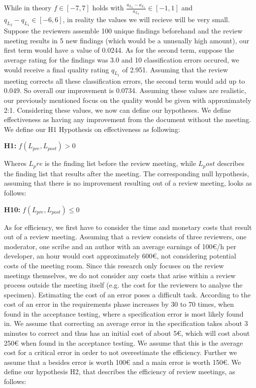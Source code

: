 While in theory $f \in [-7, 7]$ holds with $\frac{a_{L_2} - a_{L_1}}{a_{L_2}} \in [-1, 1]$ and $q_{L_2} - q_{L_1} \in [-6, 6]$, in reality the values we will recieve will be very small. Suppose the reviewers assemble 100 unique findings beforehand and the review meeting results in 5 new findings (which would be a unusually high amount), our first term
would have a value of 0.0244.
As for the second term, suppose the average rating for the findings was 3.0 and 10 classification errors occured, we would receive a final quality rating $q_{L_1}$ of 2.951. Assuming that the review meeting corrects all these classification errors, the second term would add up to 0.049. So overall our improvement is 0.0734. Assuming these values are realistic, our previously mentioned focus on the quality would be given with approximately 2:1.
Considering these values, we now can define our hypotheses.
We define effectiveness as having any improvement from the document without the meeting.
We define our H1 Hypothesis on effectiveness as following:

\begin{center}
\textbf{H1:} $f(L_{pre}, L_{post}) > 0$
\end{center}

Wheres $L_pre$ is the finding list before the review meeting, while $L_post$ describes the finding list that results after the meeting.
The corresponding null hypothesis, assuming that there is no improvement resulting out of a review meeting, looks as follows:

\begin{center}
\textbf{H10:} $f(L_{pre}, L_{post}) \le 0$
\end{center}

As for efficiency, we first have to consider the time and monetary costs that result out of a review meeting. Assuming that a review consists of three reviewers, one moderator, one scribe and an author with an average earnings of 100€/h per developer, an hour would cost approximately 600€, not considering potential costs of the meeting room. Since this research only focuses on the review meetings themselves, we do not consider any costs that arise within a review process outside the meeting itself (e.g. the cost for the reviewers to analyse the specimen). Estimating the cost of an error poses a difficult task. According to \cite{stecklein2004error} the cost of an error in the requirements phase increases by 30 to 70 times, when found in the acceptance testing, where a specification error is most likely found in. We assume that correcting an average error in the specification takes about 3 minutes to correct and thus has an initial cost of about 5€, which will cost about 250€ when found in the acceptance testing.
We assume that this is the average cost for a critical error in order to not overestimate the efficiency. Further we assume that a besides error is worth 100€ and a main error is worth 150€. We define our hypothesis H2, that describes the efficiency of review meetings, as follows:

